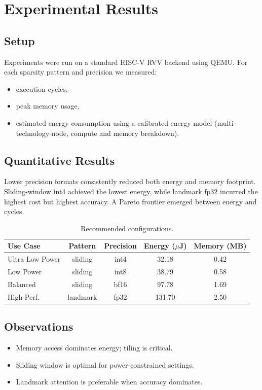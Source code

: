 \documentclass[10pt,conference]{IEEEtran}
\begin{document}
\section{Experimental Results}

\subsection{Setup}
Experiments were run on a standard RISC-V RVV backend using QEMU. For each sparsity pattern and precision we measured:
\begin{itemize}
    \item execution cycles,
    \item peak memory usage,
    \item estimated energy consumption using a calibrated energy model (multi-technology-node, compute and memory breakdown).
\end{itemize}

\subsection{Quantitative Results}
Lower precision formats consistently reduced both energy and memory footprint. Sliding-window int4 achieved the lowest energy, while landmark fp32 incurred the highest cost but highest accuracy. A Pareto frontier emerged between energy and cycles.

\begin{table}[h]
\centering
\begin{tabular}{lcccc}
\hline
Use Case & Pattern & Precision & Energy ($\mu$J) & Memory (MB) \\
\hline
Ultra Low Power & sliding & int4 & 32.18 & 0.42 \\
Low Power & sliding & int8 & 38.79 & 0.58 \\
Balanced & sliding & bf16 & 97.78 & 1.69 \\
High Perf. & landmark & fp32 & 131.70 & 2.50 \\
\hline
\end{tabular}
\caption{Recommended configurations.}
\label{tab:configs}
\end{table}

\subsection{Observations}
\begin{itemize}
    \item Memory access dominates energy; tiling is critical.
    \item Sliding window is optimal for power-constrained settings.
    \item Landmark attention is preferable when accuracy dominates.
\end{itemize}
\end{document}
